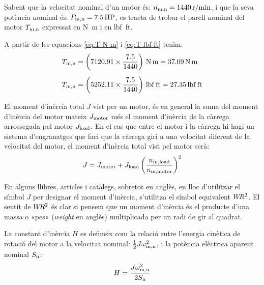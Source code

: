 	
\begin{exemple}[\MotorParellNom{}]
	\addcontentsxms{\MotorParellNom}
    Sabent que la velocitat nominal d'un motor és: $n_\mathrm{m,n} = \qty{1440}{r/min}$, i que la seva potència nominal és: $P_\mathrm{m,n} = \qty{7,5}{HP}$,   es tracta de trobar el parell nominal del motor $T_\mathrm{m,n}$ expressat en \unit{N.m} i en \unit{lbf.ft}.

    A partir de les equacions  \eqref{eq:T-N-m} i \eqref{eq:T-lbf-ft} tenim:
    \begin{align*}
      T\ped{m,n} &= \left(\num{7120,91} \times \frac{\num{7,5}}{1440}\right)
      \,\unit{N.m} = \qty{37,09}{N.m} \\[1ex]
      T\ped{m,n} &= \left(\num{5252,11} \times \frac{\num{7,5}}{1440}\right)
      \,\unit{lbf.ft} = \qty{27,35}{lbf.ft}
    \end{align*}
\end{exemple}


El moment d'inèrcia total $J$ vist per un motor, és en general la suma del moment d'inèrcia del  motor mateix $J_\mathrm{motor}$ més el moment d'inèrcia de la càrrega arrossegada pel motor $J_\mathrm{load}$. En el cas que entre el motor i la càrrega hi hagi un sistema d'engranatges que faci que la càrrega giri a una velocitat diferent de la velocitat del motor, el  moment d'inèrcia total vist pel motor serà:
\begin{equation}\index{moment d'inèrcia}\index{J@$J$}
    J = J\ped{motor} +  J\ped{load}
    \left(\frac{n\ped{m,load}}{n\ped{m,motor}}\right)^2
\end{equation}

En alguns llibres, articles i catàlegs, sobretot en anglès, en lloc d'utilitzar el símbol $J$ per designar el moment d'inèrcia, s'utilitza el símbol equivalent $W\hspace{-0.2em}R^2$. El sentit de $W\hspace{-0.2em}R^2$ és clar si pensem que un moment d'inèrcia és el producte d'una massa o «pes» (\textit{weight} en anglès) multiplicada per un radi de gir al quadrat.

La constant d'inèrcia $H$ es defineix com la relació entre l'energia cinètica de rotació del motor  a la velocitat nominal: $\frac{1}{2} J \omega_\mathrm{m,n}^2$, i la  potència elèctrica aparent nominal $S_\mathrm{n}$:
\begin{equation}\index{constant d'inèrcia}\index{H@$H$}
    H = \frac{J \omega\ped{m,n}^2}{2 S\ped{n}}
\end{equation}


